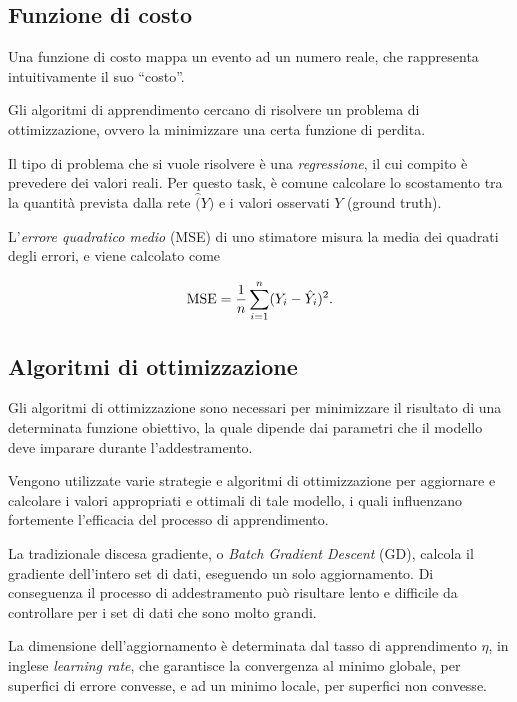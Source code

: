 \subsection{Funzione di costo}
\label{subsec:loss}

Una funzione di costo mappa un evento ad un numero reale, che rappresenta intuitivamente il suo ``costo''.

Gli algoritmi di apprendimento cercano di risolvere un problema di ottimizzazione, ovvero la minimizzare una certa funzione di perdita. 

Il tipo di problema che si vuole risolvere è una \emph{regressione}, il cui compito è prevedere dei valori reali. Per questo task, è comune calcolare lo scostamento tra la quantità prevista dalla rete $\hat(Y)$ e i valori osservati $Y$ (ground truth). 
 
L'\emph{errore quadratico medio} (MSE) di uno stimatore misura la media dei quadrati degli errori, e viene calcolato come

\begin{equation}
\operatorname{MSE} = \frac{1}{n}\sum_{i=1}^{n}(Y_i-\hat{Y}_i)^2 \mbox{.}
\end{equation}

\subsection{Algoritmi di ottimizzazione}
\label{subsec:optimizer}

Gli algoritmi di ottimizzazione sono necessari per minimizzare il risultato di una determinata funzione obiettivo, la quale dipende dai parametri che il modello deve imparare durante l'addestramento. 

Vengono utilizzate varie strategie e algoritmi di ottimizzazione per aggiornare e calcolare i valori appropriati e ottimali di tale modello, i quali influenzano fortemente l'efficacia del processo di apprendimento.

La tradizionale discesa gradiente, o \emph{Batch Gradient Descent} (GD), calcola il gradiente dell'intero set di dati, eseguendo un solo aggiornamento. Di conseguenza il processo di addestramento può risultare lento e difficile da controllare per i set di dati che sono molto grandi. 

La dimensione dell'aggiornamento è determinata dal tasso di apprendimento $\eta$, in inglese \emph{learning rate}, che garantisce la convergenza al minimo globale, per superfici di errore convesse, e ad un minimo locale, per superfici non convesse. 

